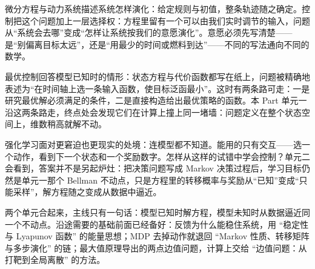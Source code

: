 微分方程与动力系统描述系统怎样演化：给定规则与初值，整条轨迹随之确定。控制把这个问题加上一层选择权：方程里留有一个可以由我们实时调节的输入，问题从``系统会去哪''变成``怎样让系统按我们的意愿演化''。意愿必须先写清楚——是``别偏离目标太远''，还是``用最少的时间或燃料到达''——不同的写法通向不同的数学。

最优控制回答模型已知时的情形：状态方程与代价函数都写在纸上，问题被精确地表述为``在时间轴上选一条输入函数，使目标泛函最小''。这时有两条路可走：一是研究最优解必须满足的条件，二是直接构造给出最优策略的函数。本 Part 单元一沿这两条路走，终点处会发现它们在计算上撞上同一堵墙：问题定义在整个状态空间上，维数稍高就解不动。

强化学习面对更窘迫也更现实的处境：连模型都不知道。能用的只有交互——选一个动作，看到下一个状态和一个奖励数字。怎样从这样的试错中学会控制？单元二会看到，答案并不是另起炉灶：把决策问题写成 Markov 决策过程后，学习目标仍然是单元一那个 Bellman 不动点，只是方程里的转移概率与奖励从``已知''变成``只能采样''，解方程随之变成从数据中逼近。

两个单元合起来，主线只有一句话：模型已知时解方程，模型未知时从数据逼近同一个不动点。沿途需要的基础前面已经备好：反馈为什么能稳住系统，用 ``稳定性与 Lyapunov 函数'' 的能量思想；MDP 去掉动作就退回 ``Markov 性质、转移矩阵与多步演化'' 的链；最大值原理导出的两点边值问题，计算上交给 ``边值问题：从打靶到全局离散'' 的方法。
